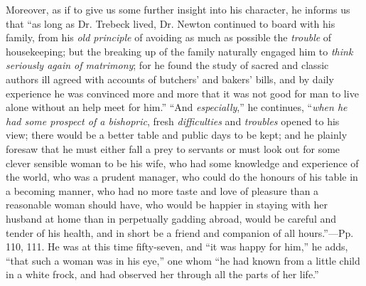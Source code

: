 Moreover, as if to give us some further insight into his character,
he informs us that ``as long as Dr. Trebeck lived, Dr.
Newton continued to board with his family, from his \emph{old principle}
of avoiding as much as possible the \emph{trouble} of housekeeping;
but the breaking up of the family naturally engaged him to \emph{think
seriously again of matrimony}; for he found the study of sacred and
classic authors ill agreed with accounts of butchers' and bakers'
bills, and by daily experience he was convinced more and more that it
was not good for man to live alone without an help meet for him.''
``And \emph{especially},'' he continues, ``\emph{when he had
some prospect of a bishopric}, fresh \emph{difficulties} and \emph{troubles}
opened to his view; there would be a better table and public days to
be kept; and he plainly foresaw that he must either fall a prey to
servants or must look out for some clever sensible woman to be his
wife, who had some knowledge and experience of the world, who was a
prudent manager, who could do the honours of his table in a becoming
manner, who had no more taste and love of pleasure than a reasonable
woman should have, who would be happier in staying with her husband at
home than in perpetually gadding abroad, would be careful and tender
of his health, and in short be a friend and companion of all
hours.''—Pp. 110, 111. He was at this time fifty-seven, and
``it was happy for him,'' he adds, ``that such a woman was
in his eye,'' one whom ``he had known from a little child in a
white frock, and had observed her through all the parts of her
life.''

